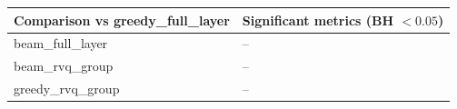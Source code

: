 \begin{tabular}{ll}
\toprule
Comparison vs greedy\_full\_layer & Significant metrics (BH $< 0.05$) \\
\midrule
beam\_full\_layer & -- \\
beam\_rvq\_group & -- \\
greedy\_rvq\_group & -- \\
\bottomrule
\end{tabular}
